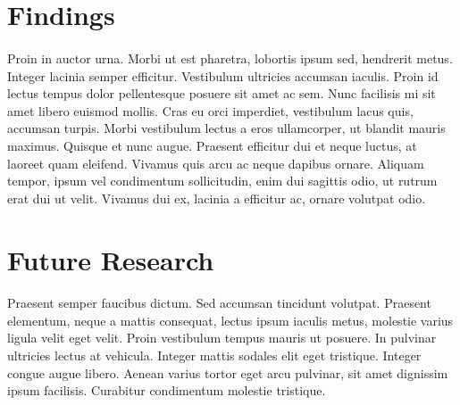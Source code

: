 \documentclass[11pt]{report}
\begin{document}
\section{Findings}
\paragraph{}
Proin in auctor urna. Morbi ut est pharetra, lobortis ipsum sed, hendrerit metus. Integer lacinia semper efficitur. Vestibulum ultricies accumsan iaculis. Proin id lectus tempus dolor pellentesque posuere sit amet ac sem. Nunc facilisis mi sit amet libero euismod mollis. Cras eu orci imperdiet, vestibulum lacus quis, accumsan turpis. Morbi vestibulum lectus a eros ullamcorper, ut blandit mauris maximus. Quisque et nunc augue. Praesent efficitur dui et neque luctus, at laoreet quam eleifend. Vivamus quis arcu ac neque dapibus ornare. Aliquam tempor, ipsum vel condimentum sollicitudin, enim dui sagittis odio, ut rutrum erat dui ut velit. Vivamus dui ex, lacinia a efficitur ac, ornare volutpat odio.

\section{Future Research}
\paragraph{}
Praesent semper faucibus dictum. Sed accumsan tincidunt volutpat. Praesent elementum, neque a mattis consequat, lectus ipsum iaculis metus, molestie varius ligula velit eget velit. Proin vestibulum tempus mauris ut posuere. In pulvinar ultricies lectus at vehicula. Integer mattis sodales elit eget tristique. Integer congue augue libero. Aenean varius tortor eget arcu pulvinar, sit amet dignissim ipsum facilisis. Curabitur condimentum molestie tristique.
\end{document}

